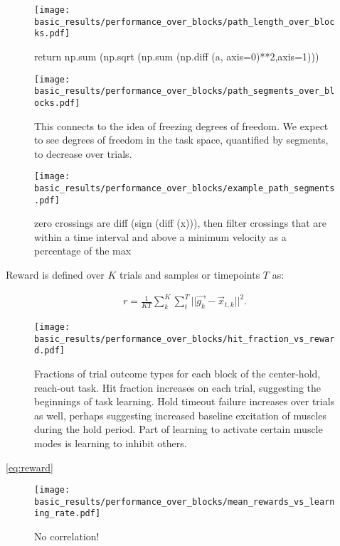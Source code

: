 \documentclass[../main.tex]{subfiles}
\begin{document}
\begin{figure}[tph]
    \centering
    \texttt{[image: basic\_results/performance\_over\_blocks/path\_length\_over\_blocks.pdf]}
    \caption[Trajectory length over trials]{return np.sum (np.sqrt (np.sum (np.diff (a, axis=0)**2,axis=1)))}\label{fig:path_length_over_blocks}
\end{figure}


\begin{figure}[tph]
    \centering
    \texttt{[image: basic\_results/performance\_over\_blocks/path\_segments\_over\_blocks.pdf]}
    \caption[Trajectory segments over trials]{This connects to the idea of freezing degrees of freedom. We expect to see degrees of freedom in the task space, quantified by segments, to decrease over trials.}\label{fig:path_segments_over_blocks}
\end{figure}


\begin{figure}[tph]
    \centering
    \texttt{[image: basic\_results/performance\_over\_blocks/example\_path\_segments.pdf]}
    \caption[Trajectory segment definition]{zero crossings are diff (sign (diff (x))), then filter crossings that are within a time interval and above a minimum velocity as a percentage of the max}\label{fig:segments}
\end{figure}


Reward is defined over $K$ trials and samples or timepoints $T$ as:

\begin{align}
    r = \frac{1}{KT}\sum_k^K\sum_t^T{|| \vec{g_k} - \vec{x}_{t,k} ||^2}.
    \label{eq:reward}
\end{align}

\begin{figure}[tph]
    \centering
    \texttt{[image: basic\_results/performance\_over\_blocks/hit\_fraction\_vs\_reward.pdf]}
    \caption[Hits versus reward]{Fractions of trial outcome types for each block of the center-hold, reach-out task. Hit fraction increases on each trial, suggesting the beginnings of task learning. Hold timeout failure increases over trials as well, perhaps suggesting increased baseline excitation of muscles during the hold period. Part of learning to activate certain muscle modes is learning to inhibit others.}\label{fig:hit_fraction_vs_reward}
\end{figure}


\cref{eq:reward}


\begin{figure}[tph]
    \centering
    \texttt{[image: basic\_results/performance\_over\_blocks/mean\_rewards\_vs\_learning\_rate.pdf]}
    \caption[Reward versus learning rate]{No correlation!}\label{fig:mean_rewards_vs_learning_rate}
\end{figure}
\end{document}
